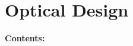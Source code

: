 
\chapter{Optical Design} %
\noindent\textbf{\large Contents:}

\noindent\hrulefill
\noindent\startcontents[chapters]
\noindent{}
\noindent\hrulefill
\label{Chapter3} %

